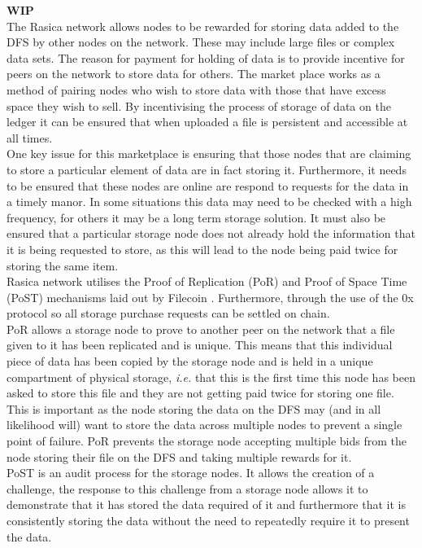 \textbf{WIP} \\

The Rasica network allows nodes to be rewarded for storing data added to the DFS by other nodes on the network. These may include large files or complex data sets. The reason for payment for holding of data is to provide incentive for peers on the network to store data for others. The market place works as a method of pairing nodes who wish to store data with those that have excess space they wish to sell. By incentivising the process of storage of data on the ledger it can be ensured that when uploaded a file is persistent and accessible at all times. \\

One key issue for this marketplace is ensuring that those nodes that are claiming to store a particular element of data are in fact storing it. Furthermore, it needs to be ensured that these nodes are online are respond to requests for the data in a timely manor. In some situations this data may need to be checked with a high frequency, for others it may be a long term storage solution. It must also be ensured that a particular storage node does not already hold the information that it is being requested to store, as this will lead to the node being paid twice for storing the same item. \\

Rasica network utilises the Proof of Replication (PoR) and Proof of Space Time (PoST) mechanisms laid out by Filecoin \cite{benet2018filecoin}. Furthermore, through the use of the 0x protocol \cite{warren20170x} so all storage purchase requests can be settled on chain.  \\

PoR allows a storage node to prove to another peer on the network that a file given to it has been replicated and is unique. This means that this individual piece of data has been copied by the storage node and is held in a unique compartment of physical storage, \textit{i.e.} that this is the first time this node has been asked to store this file and they are not getting paid twice for storing one file. This is important as the node storing the data on the DFS may (and in all likelihood will) want to store the data across multiple nodes to prevent a single point of failure. PoR prevents the storage node accepting multiple bids from the node storing their file on the DFS and taking multiple rewards for it. \\

PoST is an audit process for the storage nodes. It allows the creation of a challenge, the response to this challenge from a storage node allows it to demonstrate that it has stored the data required of it and furthermore that it is consistently storing the data without the need to repeatedly require it to present the data. 